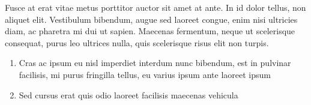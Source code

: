 Fusce at erat vitae metus porttitor auctor sit amet at ante. In id dolor tellus, 
non aliquet elit. Vestibulum bibendum, augue sed laoreet congue, enim nisi 
ultricies diam, ac pharetra mi dui ut sapien. Maecenas fermentum, neque ut 
scelerisque consequat, purus leo ultrices nulla, quis scelerisque risus elit non 
turpis. 

\begin{enumerate}
\item Cras ac ipsum eu nisl imperdiet interdum nunc bibendum, est in pulvinar 
facilisis, mi purus fringilla tellus, eu varius ipsum ante laoreet ipsum
\item Sed cursus erat quis odio laoreet facilisis maecenas vehicula
\end{enumerate}
